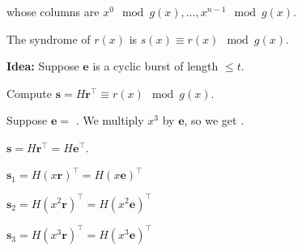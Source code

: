 whose columns are $ x^0 \mod g(x),\ldots ,x^{n-1} \mod g(x) $.

The syndrome of $ r(x) $ is $ s(x)\equiv r(x)\mod g(x) $.

\textbf{Idea:} Suppose $ \bm{e} $ is a cyclic burst of length $ \leqslant t $.

Compute $ \bm{s}=H\bm{r}^\top\equiv r(x)\mod g(x) $.

Suppose $ \bm{e}= $  . We multiply $ x^3 $ by $ \bm{e} $,
so we get .

$ \bm{s}=H\bm{r}^\top=H\bm{e}^\top $.

$ \bm{s}_1=H(x\bm{r})^\top = H(x\bm{e})^\top $

$ \bm{s}_2=H(x^2\bm{r})^\top = H(x^2\bm{e})^\top $

$ \bm{s}_3=H(x^3\bm{r})^\top = H(x^3\bm{e})^\top $
